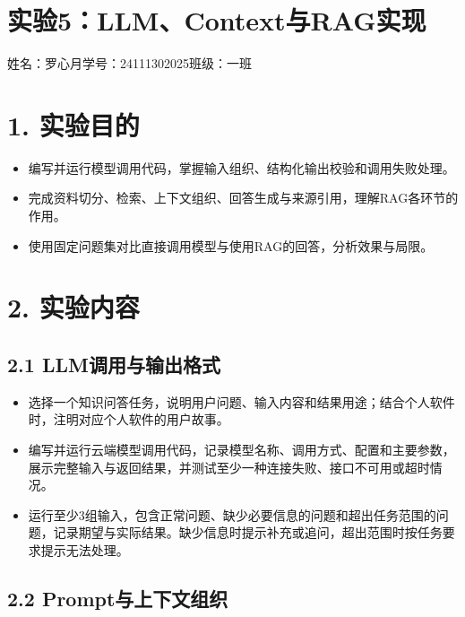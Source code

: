 \documentclass[UTF8,12pt,a4paper]{ctexart}
\def\thelstlisting{5-\arabic{lstlisting}}
\begin{document}
\renewcommand{\thelstlisting}{5-\arabic{lstlisting}}

\section*{实验5：LLM、Context与RAG实现}

\begin{center}
姓名：罗心月\qquad 学号：24111302025\qquad 班级：一班
\end{center}

\section*{1. 实验目的}

\begin{itemize}
  \item 编写并运行模型调用代码，掌握输入组织、结构化输出校验和调用失败处理。
  \item 完成资料切分、检索、上下文组织、回答生成与来源引用，理解RAG各环节的作用。
  \item 使用固定问题集对比直接调用模型与使用RAG的回答，分析效果与局限。
\end{itemize}

\section*{2. 实验内容}

\subsection*{2.1 LLM调用与输出格式}

\begin{itemize}
  \item 选择一个知识问答任务，说明用户问题、输入内容和结果用途；结合个人软件时，注明对应个人软件的用户故事。
  \item 编写并运行云端模型调用代码，记录模型名称、调用方式、配置和主要参数，展示完整输入与返回结果，并测试至少一种连接失败、接口不可用或超时情况。
  \item 运行至少3组输入，包含正常问题、缺少必要信息的问题和超出任务范围的问题，记录期望与实际结果。缺少信息时提示补充或追问，超出范围时按任务要求提示无法处理。
\end{itemize}

\subsection*{2.2 Prompt与上下文组织}
\end{document}
